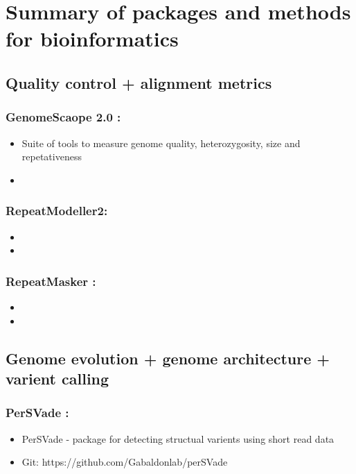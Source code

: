 \documentclass[document.tex]{subfiles}
\begin{document}
\chapter{Summary of packages and methods for bioinformatics}
\label{day:2023-02-15}

\section*{Quality control + alignment metrics}

    \subsection{GenomeScaope 2.0 :}
    \begin{itemize}
    \item Suite of tools to measure genome quality, heterozygosity, size and repetativeness
    \item 
    \end{itemize}

    \subsection{RepeatModeller2:}
    \begin{itemize}
    \item 
    \item 
    \end{itemize}

    \subsection{RepeatMasker :\citetitle{}}
    \begin{itemize}
    \item 
    \item 
    \end{itemize}

\section*{Genome evolution + genome architecture + varient calling}

    \subsection{PerSVade :}
    \begin{itemize}
    \item PerSVade - package for detecting structual varients using short read data
    \item Git: https://github.com/Gabaldonlab/perSVade 
    \end{itemize}
    
\end{document}
